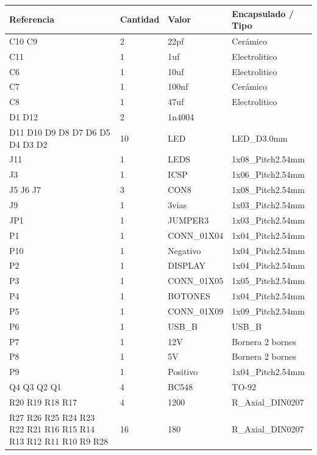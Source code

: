 \begin{table}[H]
	\begin{tabular}{|p{}|p{}|p{}|p{}|}
		\hline
		\textbf{Referencia} & \multicolumn{1}{l|}{\textbf{Cantidad}} & \textbf{Valor} & \textbf{Encapsulado} / Tipo \\ \hline
		C10 C9 & 2 & 22pf & Cerámico \\ \hline
		C11 & 1 & 1uf & Electrolitico \\ \hline
		C6 & 1 & 10uf & Electrolitico \\ \hline
		C7 & 1 & 100nf & Cerámico \\ \hline
		C8 & 1 & 47uf & Electrolitico \\ \hline
		D1 D12 & 2 & 1n4004 &  \\ \hline
		D11 D10 D9 D8 D7 D6 D5 
		D4 D3 D2 & 10 & LED & LED\_D3.0mm \\ \hline
		J11 & 1 & LEDS & 1x08\_Pitch2.54mm \\ \hline
		J3 & 1 & ICSP & 1x06\_Pitch2.54mm \\ \hline
		J5 J6 J7 & 3 & CON8 & 1x08\_Pitch2.54mm \\ \hline
		J9 & 1 & 3vias & 1x03\_Pitch2.54mm \\ \hline
		JP1 & 1 & JUMPER3 & 1x03\_Pitch2.54mm \\ \hline
		P1 & 1 & CONN\_01X04 & 1x04\_Pitch2.54mm \\ \hline
		P10 & 1 & Negativo & 1x04\_Pitch2.54mm \\ \hline
		P2 & 1 & DISPLAY & 1x04\_Pitch2.54mm \\ \hline
		P3 & 1 & CONN\_01X05 & 1x05\_Pitch2.54mm \\ \hline
		P4 & 1 & BOTONES & 1x04\_Pitch2.54mm \\ \hline
		P5 & 1 & CONN\_01X09 & 1x09\_Pitch2.54mm \\ \hline
		P6 & 1 & USB\_B & USB\_B \\ \hline
		P7 & 1 & 12V & Bornera 2 bornes \\ \hline
		P8 & 1 & 5V & Bornera 2 bornes \\ \hline
		P9 & 1 & Positivo & 1x04\_Pitch2.54mm \\ \hline
		Q4 Q3 Q2 Q1 & 4 & BC548 & TO-92 \\ \hline
		R20 R19 R18 R17 & 4 & 1200 & R\_Axial\_DIN0207 \\ \hline
		R27 R26 R25 R24 R23 R22 
		R21 R16 R15 R14 R13 R12 
		R11 R10 R9 R28 & 16 & 180 & R\_Axial\_DIN0207 \\ \hline

\end{tabular}
\end{table}
